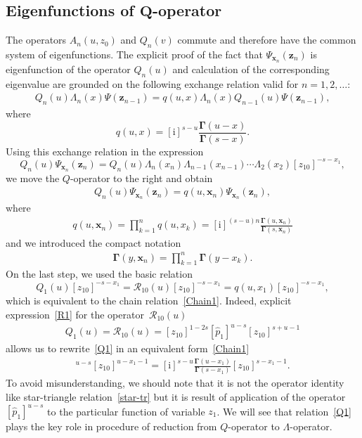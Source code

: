 \documentclass[10pt,a4paper]{amsart}
\renewcommand{\imath}{\mathrm{i}}
\numberwithin{equation}{section}
\begin{document}
\subsection[Eigenfunctions of Q-operator]{Eigenfunctions of $\boldsymbol{Q}$-operator}

The operators $A_n(u,z_0)$ and $Q_n(v)$ commute and
therefore have the common system of eigenfunctions.
The explicit proof of the fact that
$\Psi_{\bm x_n}(\bm z_n)$ is eigenfunction
of the operator $Q_n(u)$ and calculation of the corresponding eigenvalue
are grounded on the following exchange relation valid for $n=1 ,2 ,\dots$:
\begin{align}
\label{exchQA}
Q_n(u) \Lambda_n(x) \Psi(\bm z_{n-1})
= q(u ,x) \Lambda_n(x) Q_{n-1}(u) \Psi(\bm z_{n-1}) ,
\end{align}
where
\begin{equation*}
	q(u ,x) = [\imath]^{s-u} \frac{\mathbf{\Gamma}(u-x)}{\mathbf{\Gamma}(s-x)} .
\end{equation*}
Using this exchange relation in the expression
\begin{equation*}
	Q_n(u) \Psi_{\bm x_n}(\bm z_n) =
	Q_n(u) \Lambda_n(x_n)
	\Lambda_{n-1}(x_{n-1})\cdots
	\Lambda_{2}(x_{2}) [z_{10}]^{-s-x_1},
\end{equation*}
we move the $Q$-operator to the right and obtain
\begin{align}
	\label{QPsi}
	Q_n(u) \Psi_{\bm x_n}(\bm z_n)
	= q(u ,\bm x_{n})
	 \Psi_{\bm x_n}(\bm z_n) ,
\end{align}
where
\begin{align}\label{qn}
q(u ,\bm x_{n}) = \prod_{k=1}^n q(u ,x_{k}) =
[\imath]^{(s-u)n}
\frac{\mathbf{\Gamma}(u ,\bm{x}_n)}{\mathbf{\Gamma}(s ,\bm{x}_n)}
\end{align}
and we introduced the compact notation
\begin{align*}
\mathbf{\Gamma}(y ,\bm{x}_n) = \prod_{k=1}^n \mathbf{\Gamma}(y-x_k) .
\end{align*}
On the last step, we used the basic relation
\begin{equation}\label{Q1}
	Q_1(u) [z_{10}]^{-s-x_1} =
\mathcal{R}_{10}(u) [z_{10}]^{-s-x_1}
	= q(u,x_1) [z_{10}]^{-s-x_1} ,
\end{equation}
which is equivalent to the chain relation~\eqref{Chain1}.
Indeed, explicit expression~\eqref{R1} for the
operator~$\mathcal{R}_{10}(u)$
\begin{align*}
Q_1( u) = \mathcal{R}_{10}(u) = [z_{10}]^{1-2s}
[\hat{p}_1]^{u-s} [z_{10}]^{s+u-1}
\end{align*}
allows us to rewrite~\eqref{Q1} in an equivalent form~\eqref{Chain1}
\begin{align*}
[\hat{p}_1]^{u-s} [z_{10}]^{u-x_1-1} = [\imath]^{s-u} \frac{\mathbf{\Gamma}(u-x_1)}{\mathbf{\Gamma}(s-x_1)}
 [z_{10}]^{s-x_1-1} .
\end{align*}
To avoid misunderstanding, we should note that
it is not the operator identity like star-triangle relation~\eqref{star-tr} but it is result of application of the operator
$[\hat{p}_1]^{u-s}$ to the particular function of variable $z_1$.
We will see that relation~\eqref{Q1} plays the key role in
procedure of reduction from $Q$-operator to $\Lambda$-operator.
\end{document}
